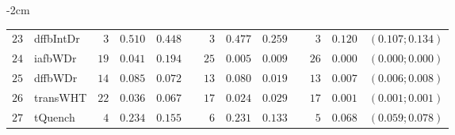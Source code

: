 \begin{table*}[!htbp]
\begin{adjustwidth*}{}{-2cm}
\begin{tabular}{@{}rlrrrrrrrrrcc@{}}
\footnotesize{$23$} & \footnotesize{dffbIntDr} & \footnotesize{$3 $} & \footnotesize{$0.510$} & \footnotesize{$0.448$} && \footnotesize{$3 $} & \footnotesize{$0.477$} & \footnotesize{$0.259$} && \footnotesize{$3 $} & \footnotesize{$0.120$} & \footnotesize{$(0.107;0.134)$} \\
\footnotesize{$24$} & \footnotesize{iafbWDr  } & \footnotesize{$19$} & \footnotesize{$0.041$} & \footnotesize{$0.194$} && \footnotesize{$25$} & \footnotesize{$0.005$} & \footnotesize{$0.009$} && \footnotesize{$26$} & \footnotesize{$0.000$} & \footnotesize{$(0.000;0.000)$} \\
\footnotesize{$25$} & \footnotesize{dffbWDr  } & \footnotesize{$14$} & \footnotesize{$0.085$} & \footnotesize{$0.072$} && \footnotesize{$13$} & \footnotesize{$0.080$} & \footnotesize{$0.019$} && \footnotesize{$13$} & \footnotesize{$0.007$} & \footnotesize{$(0.006;0.008)$} \\
\footnotesize{$26$} & \footnotesize{transWHT } & \footnotesize{$22$} & \footnotesize{$0.036$} & \footnotesize{$0.067$} && \footnotesize{$17$} & \footnotesize{$0.024$} & \footnotesize{$0.029$} && \footnotesize{$17$} & \footnotesize{$0.001$} & \footnotesize{$(0.001;0.001)$} \\
\footnotesize{$27$} & \footnotesize{tQuench  } & \footnotesize{$4 $} & \footnotesize{$0.234$} & \footnotesize{$0.155$} && \footnotesize{$6 $} & \footnotesize{$0.231$} & \footnotesize{$0.133$} && \footnotesize{$5 $} & \footnotesize{$0.068$} & \footnotesize{$(0.059;0.078)$} \\
\bottomrule
\end{tabular}
\end{adjustwidth*}
\end{table*}

